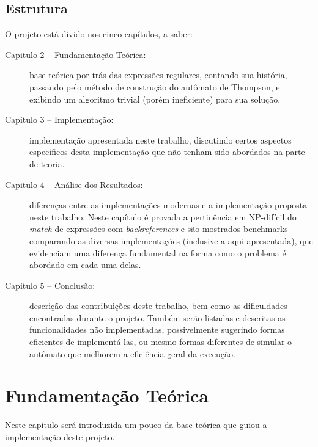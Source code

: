\documentclass[a4paper,12pt,oneside,onecolumn]{uerj}
\begin{document}
\section{Estrutura}

O projeto está divido nos cinco capítulos, a saber:

\begin{description}

\item[Capitulo 2 -- Fundamentação Teórica:] base teórica por trás das expressões regulares, contando sua história, passando pelo método de construção do autômato de Thompson, e exibindo um algoritmo trivial (porém ineficiente) para sua solução.

\item[Capitulo 3 -- Implementação:] implementação apresentada neste trabalho, discutindo certos aspectos específicos desta implementação que não tenham sido abordados na parte de teoria. 

\item[Capitulo 4 -- Análise dos Resultados:] diferenças entre as implementações modernas e a implementação proposta neste trabalho. Neste capítulo é provada a pertinência em NP-difícil do \emph{match} de expressões com \emph{backreferences} e são mostrados benchmarks comparando as diversas implementações (inclusive a aqui apresentada), que evidenciam uma diferença fundamental na forma como o problema é abordado em cada uma delas. 

\item[Capitulo 5 -- Conclusão:] descrição das contribuições deste trabalho, bem como as dificuldades encontradas durante o projeto. Também serão listadas e descritas as funcionalidades não implementadas, possivelmente sugerindo formas eficientes de implementá-las, ou mesmo formas diferentes de simular o autômato que melhorem a eficiência geral da execução. 

\end{description}

\chapter{Fundamentação Teórica}\label{cap:theory}

Neste capítulo será introduzida um pouco da base teórica que guiou a implementação deste projeto.
\end{document}
